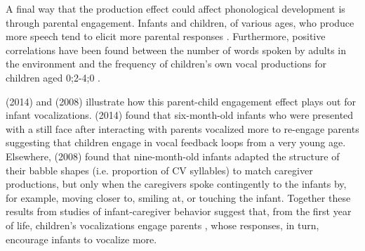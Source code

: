 \documentclass[a4paper,man,natbib,donotrepeattitle, apacite]{apa6}
\begin{document}
A final way that the production effect could affect phonological development is through parental engagement. Infants and children, of various ages, who produce more speech tend to elicit more parental responses \cite{franklinEffectsParentalInteraction2014,goldsteinSocialFeedbackInfants2008,mcgillionWhatPavesWay2017,pretzerInfantadultVocalInteraction2019,warlaumontSocialFeedbackLoop2014}. Furthermore, positive correlations have been found between the number of words spoken by adults in the environment and the frequency of children’s own vocal productions for children aged 0;2-4;0 \cite{gilkersonImpactAdultTalk2009,orenaReliabilityLanguageEnvironment2019,weislederTalkingChildrenMatters2013}. 

\citeauthor{franklinEffectsParentalInteraction2014} (2014) and \citeauthor{goldsteinSocialFeedbackInfants2008} (2008) illustrate how this parent-child engagement effect plays out for infant vocalizations. \citeauthor{franklinEffectsParentalInteraction2014} (2014) found that six-month-old infants who were presented with a still face after interacting with parents vocalized more to re-engage parents suggesting that children engage in vocal feedback loops from a very young age. Elsewhere, \citeauthor{goldsteinSocialFeedbackInfants2008} (2008) found that nine-month-old infants adapted the structure of their babble shapes (i.e. proportion of CV syllables) to match caregiver productions, but only when the caregivers spoke contingently to the infants by, for example, moving closer to, smiling at, or touching the infant. Together these results from studies of infant-caregiver behavior suggest that, from the first year of life, children’s vocalizations engage parents  \cite{albertSocialFunctionsBabbling2018}, whose responses, in turn, encourage infants to vocalize more. 
\end{document}
